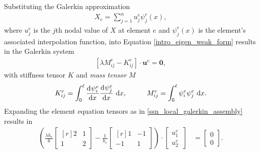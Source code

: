 Substituting the Galerkin approximation
\begin{align*}
  X_e = \sum_{j=1}^n u_j^e \psi_j^e(x),
\end{align*}
where $u_j^e$ is the $j$th nodal value of $X$ at element $e$ and $\psi_j^e(x)$ is the element's associated interpolation function, into Equation \cref{intro_eigen_weak_form} results in the Galerkin system
\begin{align*}
  \left[ \lambda M_{ij}^e - K_{ij}^e \right] \cdot \mathbf{u}^e = \mathbf{0},
\end{align*}
with stiffness tensor $K$ and  \emph{mass tensor} $M$
\begin{align*}
  K_{ij}^e = \int_0^{\ell} \totder{\psi_i^e}{x} \totder{\psi_j^e}{x} \d{x}, \hspace{10mm} M_{ij}^e = \int_0^{\ell} \psi_i^e \psi_j^e \d{x}.
\end{align*}
Expanding the element equation tensors as in \cref{ssn_local_galerkin_assembly} results in
\begin{align*}
  \left( \frac{\lambda h_e}{6} \begin{bmatrix}[r]
                                 2 & 1 \\
                                 1 & 2
                               \end{bmatrix}
         - \frac{1}{h_e} \begin{bmatrix}[r]
                            1 & -1 \\
                           -1 & 1
                         \end{bmatrix}
  \right) \cdot
  \begin{bmatrix}
    u_1^e \\
    u_2^e\
  \end{bmatrix} &=
  \begin{bmatrix}
    0 \\
    0
  \end{bmatrix}.
\end{align*}

